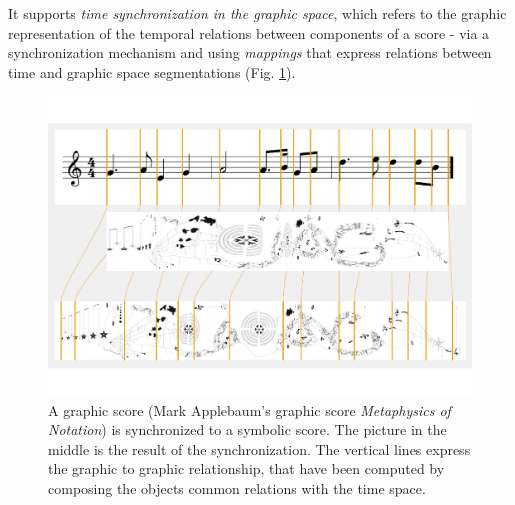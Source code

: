 \documentclass[11pt,a4paper]{article}
\begin{document}
It supports \emph{time synchronization in the graphic space}, which refers to the graphic representation of the temporal relations between components of a score - via a synchronization mechanism and using \emph{mappings} that express relations between time and graphic space segmentations (Fig. \ref{fig:sync}).
\begin{figure}[ht]
\begin{center}
	\includegraphics[width=1.\columnwidth]{imgs/syncAB}
\caption{A graphic score (Mark Applebaum's graphic score \emph{Metaphysics of Notation}) is synchronized to a symbolic score. The picture in the middle is the result of the synchronization. The vertical lines express the graphic to graphic relationship, that have been computed by composing the objects common relations with the time space.}
\label{fig:sync}
\end{center}
\end{figure}
\end{document}
